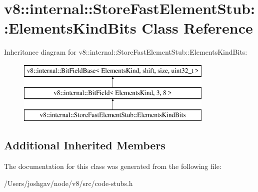\hypertarget{classv8_1_1internal_1_1_store_fast_element_stub_1_1_elements_kind_bits}{}\section{v8\+:\+:internal\+:\+:Store\+Fast\+Element\+Stub\+:\+:Elements\+Kind\+Bits Class Reference}
\label{classv8_1_1internal_1_1_store_fast_element_stub_1_1_elements_kind_bits}
Inheritance diagram for v8\+:\+:internal\+:\+:Store\+Fast\+Element\+Stub\+:\+:Elements\+Kind\+Bits\+:\begin{figure}[H]
\begin{center}
\leavevmode
\includegraphics[height=3.000000cm]{classv8_1_1internal_1_1_store_fast_element_stub_1_1_elements_kind_bits}
\end{center}
\end{figure}
\subsection*{Additional Inherited Members}


The documentation for this class was generated from the following file\+:\begin{DoxyCompactItemize}
\item 
/\+Users/joshgav/node/v8/src/code-\/stubs.\+h\end{DoxyCompactItemize}
